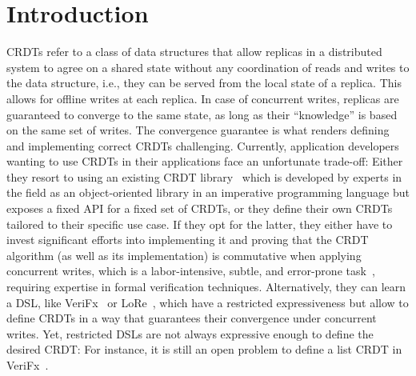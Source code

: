 
\chapter{Introduction}\label{ch:intro}

\acp{CRDT} refer to a class of data structures that allow replicas in a distributed
system to agree on a shared state without any coordination of reads and writes
to the data structure, i.e., they can be served from the local state of a replica.
This allows for offline writes at each replica.
In case of concurrent writes, replicas are guaranteed to converge to the same state,
as long as their ``knowledge'' is based on the same set of writes.
The convergence guarantee is what renders defining and implementing
correct \acp{CRDT} challenging.
Currently, application developers wanting to use \acp{CRDT} in their applications
face an unfortunate trade-off:
Either they resort to using an existing \ac{CRDT} library~\cite{automerge,yjs}
which is developed by experts in the field as an object-oriented library
in an imperative programming language but exposes a fixed \ac{API} for a fixed
set of \acp{CRDT},
or they define their own \acp{CRDT} tailored to their specific use case.
If they opt for the latter, they either have to invest significant efforts
into implementing it and proving that the \ac{CRDT} algorithm
(as well as its implementation) is commutative when applying concurrent writes,
which is a labor-intensive, subtle, and error-prone
task~\cite{gomes2017verifying,kleppmann2022assessing},
requiring expertise in formal verification techniques.
Alternatively, they can learn a \ac{DSL}, like VeriFx~\cite{verifx}
or LoRe~\cite{lore}, which have a restricted expressiveness but allow to define
\acp{CRDT} in a way that guarantees their convergence under concurrent writes.
Yet, restricted \acp{DSL} are not always expressive enough
to define the desired \ac{CRDT}:
For instance, it is still an open problem to define a list \ac{CRDT} in
VeriFx~\cite{TODO}.

